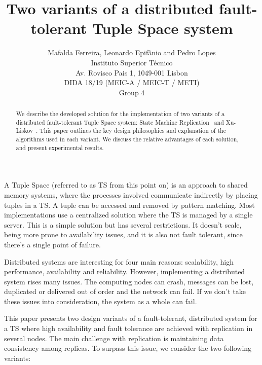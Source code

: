 \documentclass[times, 10pt,twocolumn]{article}
\begin{document}
\title{ Two variants of a distributed fault-tolerant Tuple Space system}

\author{Mafalda Ferreira, Leonardo Epif\^{a}nio and Pedro Lopes\\
Instituto Superior T\'{e}cnico\\ 
Av. Rovisco Pais 1, 1049-001 Lisbon\\
DIDA 18/19 (MEIC-A / MEIC-T / METI)\\
Group 4
}

\maketitle
\thispagestyle{empty}

\begin{abstract}
   We describe the developed solution for the implementation of two variants
   of a distributed fault-tolerant Tuple Space system: State Machine Replication~\cite{Bakken:1995:SFP:203121.203132} and Xu-Liskov~\cite{Xu1989ADF}. 
   This paper outlines the key design philosophies and explanation of the 
   algorithms used in each variant. We discuss the relative advantages of each solution,
   and present experimental results.
\end{abstract}

 \label{introduction}

A Tuple Space (referred to as TS from this point on) is an approach to shared memory systems, where the processes involved 
communicate indirectly by placing tuples in a TS. A tuple 
can be accessed and removed by pattern matching. Most implementations use a 
centralized solution where the TS is managed by a single server. This is a simple 
solution but has several restrictions. It doesn't scale, being more prone to availability issues, and it is also not fault tolerant, since there's a single point of failure. 

Distributed systems are interesting for four main reasons: scalability, high performance, 
availability and reliability. However, implementing a distributed system rises many issues. The computing 
nodes can crash, messages can be lost, duplicated or delivered out of order and the network 
can fail. If we don't take these issues into consideration, the system as a whole can fail.

This paper presents two design variants of a fault-tolerant, distributed system for a 
TS where high availability and fault tolerance are achieved with replication in several nodes. 
The main challenge with replication is maintaining data consistency among replicas. To surpass
this issue, we consider the two following variants:
\end{document}
